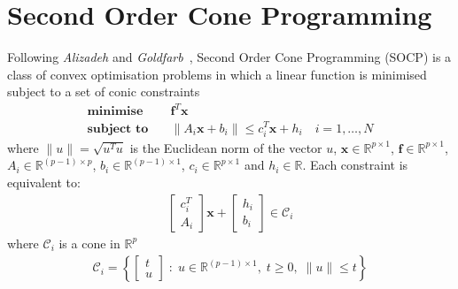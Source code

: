 \documentclass[a4paper,twoside,10pt,english]{report}
\begin{document}
\section{Second Order Cone Programming}
Following \emph{Alizadeh} and \emph{Goldfarb}~\cite
{AlizadehGoldfarb_SecondOrderCone}, Second Order Cone
Programming (SOCP) is a class of convex optimisation problems in which a linear
function is minimised subject to a set of conic constraints
\begin{align*}
\textbf{minimise}\quad& \boldsymbol{f}^{T}\boldsymbol{x}\\
\textbf{subject to}\quad & \| A_{i}\boldsymbol{x}+b_{i}\| 
\le c_{i}^{T}\boldsymbol{x}+h_{i} \quad i=1,\hdots,N
\end{align*}
where $\|u\|=\sqrt{u^{T}u}$ is the Euclidean norm of the vector $u$, 
$\boldsymbol{x}\in\mathfrak{\mathbb{R}}^{p\times 1}$, 
$\boldsymbol{f}\in\mathfrak{\mathbb{R}}^{p\times 1}$, 
$A_{i}\in\mathfrak{\mathbb{R}}^{\left(p-1\right)\times p}$, 
$b_{i}\in\mathfrak{\mathbb{R}}^{\left(p-1\right)\times 1}$, 
$c_{i}\in\mathfrak{\mathbb{R}}^{p\times 1}$ and $h_{i}\in\mathfrak{\mathbb{R}}$.
Each constraint is equivalent to:
\begin{align*}
\left[\begin{array}{c}
c_{i}^{T}\\
A_{i}
\end{array}\right] \boldsymbol{x} + \left[\begin{array}{c}
h_{i}\\
b_{i}
\end{array}\right] \in \mathcal{C}_{i}
\end{align*}
where $\mathcal{C}_{i}$ is a cone in $\mathfrak{\mathbb{R}}^{p}$
\begin{align*}
\mathcal{C}_{i} = \left\{\left[\begin{array}{c}
t\\
u
\end{array}\right]\; : \; u \in \mathfrak{\mathbb{R}}^{\left(p-1\right)\times 1},\;
 t\ge 0,\; \| u \| \le t \right\}
\end{align*}
\end{document}
